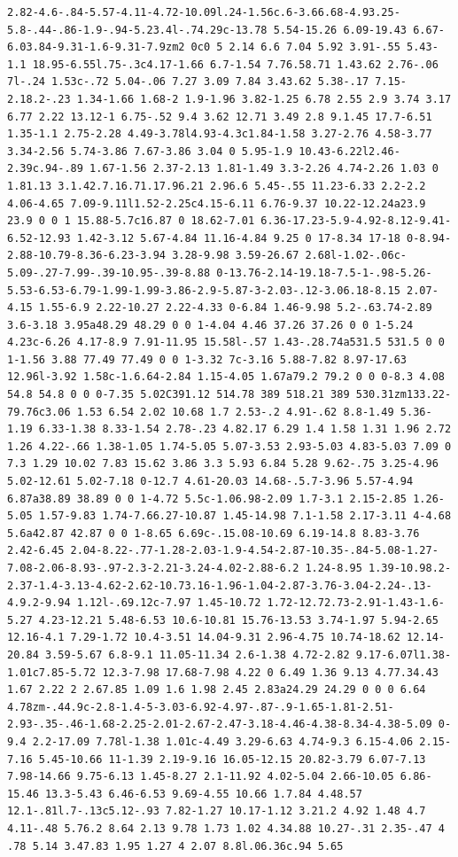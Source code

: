 \documentclass[11pt]{article}
\begin{document}
\begin{enumerate}
\begin{verbatim}
2.82-4.6-.84-5.57-4.11-4.72-10.09l.24-1.56c.6-3.66.68-4.93.25-5.8-.44-.86-1.9-.94-5.23.4l-.74.29c-13.78 5.54-15.26 6.09-19.43 6.67-6.03.84-9.31-1.6-9.31-7.9zm2 0c0 5 2.14 6.6 7.04 5.92 3.91-.55 5.43-1.1 18.95-6.55l.75-.3c4.17-1.66 6.7-1.54 7.76.58.71 1.43.62 2.76-.06 7l-.24 1.53c-.72 5.04-.06 7.27 3.09 7.84 3.43.62 5.38-.17 7.15-2.18.2-.23 1.34-1.66 1.68-2 1.9-1.96 3.82-1.25 6.78 2.55 2.9 3.74 3.17 6.77 2.22 13.12-1 6.75-.52 9.4 3.62 12.71 3.49 2.8 9.1.45 17.7-6.51 1.35-1.1 2.75-2.28 4.49-3.78l4.93-4.3c1.84-1.58 3.27-2.76 4.58-3.77 3.34-2.56 5.74-3.86 7.67-3.86 3.04 0 5.95-1.9 10.43-6.22l2.46-2.39c.94-.89 1.67-1.56 2.37-2.13 1.81-1.49 3.3-2.26 4.74-2.26 1.03 0 1.81.13 3.1.42.7.16.71.17.96.21 2.96.6 5.45-.55 11.23-6.33 2.2-2.2 4.06-4.65 7.09-9.11l1.52-2.25c4.15-6.11 6.76-9.37 10.22-12.24a23.9 23.9 0 0 1 15.88-5.7c16.87 0 18.62-7.01 6.36-17.23-5.9-4.92-8.12-9.41-6.52-12.93 1.42-3.12 5.67-4.84 11.16-4.84 9.25 0 17-8.34 17-18 0-8.94-2.88-10.79-8.36-6.23-3.94 3.28-9.98 3.59-26.67 2.68l-1.02-.06c-5.09-.27-7.99-.39-10.95-.39-8.88 0-13.76-2.14-19.18-7.5-1-.98-5.26-5.53-6.53-6.79-1.99-1.99-3.86-2.9-5.87-3-2.03-.12-3.06.18-8.15 2.07-4.15 1.55-6.9 2.22-10.27 2.22-4.33 0-6.84 1.46-9.98 5.2-.63.74-2.89 3.6-3.18 3.95a48.29 48.29 0 0 1-4.04 4.46 37.26 37.26 0 0 1-5.24 4.23c-6.26 4.17-8.9 7.91-11.95 15.58l-.57 1.43-.28.74a531.5 531.5 0 0 1-1.56 3.88 77.49 77.49 0 0 1-3.32 7c-3.16 5.88-7.82 8.97-17.63 12.96l-3.92 1.58c-1.6.64-2.84 1.15-4.05 1.67a79.2 79.2 0 0 0-8.3 4.08 54.8 54.8 0 0 0-7.35 5.02C391.12 514.78 389 518.21 389 530.31zm133.22-79.76c3.06 1.53 6.54 2.02 10.68 1.7 2.53-.2 4.91-.62 8.8-1.49 5.36-1.19 6.33-1.38 8.33-1.54 2.78-.23 4.82.17 6.29 1.4 1.58 1.31 1.96 2.72 1.26 4.22-.66 1.38-1.05 1.74-5.05 5.07-3.53 2.93-5.03 4.83-5.03 7.09 0 7.3 1.29 10.02 7.83 15.62 3.86 3.3 5.93 6.84 5.28 9.62-.75 3.25-4.96 5.02-12.61 5.02-7.18 0-12.7 4.61-20.03 14.68-.5.7-3.96 5.57-4.94 6.87a38.89 38.89 0 0 1-4.72 5.5c-1.06.98-2.09 1.7-3.1 2.15-2.85 1.26-5.05 1.57-9.83 1.74-7.66.27-10.87 1.45-14.98 7.1-1.58 2.17-3.11 4-4.68 5.6a42.87 42.87 0 0 1-8.65 6.69c-.15.08-10.69 6.19-14.8 8.83-3.76 2.42-6.45 2.04-8.22-.77-1.28-2.03-1.9-4.54-2.87-10.35-.84-5.08-1.27-7.08-2.06-8.93-.97-2.3-2.21-3.24-4.02-2.88-6.2 1.24-8.95 1.39-10.98.2-2.37-1.4-3.13-4.62-2.62-10.73.16-1.96-1.04-2.87-3.76-3.04-2.24-.13-4.9.2-9.94 1.12l-.69.12c-7.97 1.45-10.72 1.72-12.72.73-2.91-1.43-1.6-5.27 4.23-12.21 5.48-6.53 10.6-10.81 15.76-13.53 3.74-1.97 5.94-2.65 12.16-4.1 7.29-1.72 10.4-3.51 14.04-9.31 2.96-4.75 10.74-18.62 12.14-20.84 3.59-5.67 6.8-9.1 11.05-11.34 2.6-1.38 4.72-2.82 9.17-6.07l1.38-1.01c7.85-5.72 12.3-7.98 17.68-7.98 4.22 0 6.49 1.36 9.13 4.77.34.43 1.67 2.22 2 2.67.85 1.09 1.6 1.98 2.45 2.83a24.29 24.29 0 0 0 6.64 4.78zm-.44.9c-2.8-1.4-5-3.03-6.92-4.97-.87-.9-1.65-1.81-2.51-2.93-.35-.46-1.68-2.25-2.01-2.67-2.47-3.18-4.46-4.38-8.34-4.38-5.09 0-9.4 2.2-17.09 7.78l-1.38 1.01c-4.49 3.29-6.63 4.74-9.3 6.15-4.06 2.15-7.16 5.45-10.66 11-1.39 2.19-9.16 16.05-12.15 20.82-3.79 6.07-7.13 7.98-14.66 9.75-6.13 1.45-8.27 2.1-11.92 4.02-5.04 2.66-10.05 6.86-15.46 13.3-5.43 6.46-6.53 9.69-4.55 10.66 1.7.84 4.48.57 12.1-.81l.7-.13c5.12-.93 7.82-1.27 10.17-1.12 3.21.2 4.92 1.48 4.7 4.11-.48 5.76.2 8.64 2.13 9.78 1.73 1.02 4.34.88 10.27-.31 2.35-.47 4 .78 5.14 3.47.83 1.95 1.27 4 2.07 8.8l.06.36c.94 5.65 
\end{verbatim}
\end{enumerate}
\end{document}
